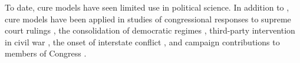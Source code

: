 \documentclass{article}
\begin{document}
	To date, cure models have seen limited use in political science. In addition to \citep{svolik2008}, cure models have been applied in studies of congressional responses to supreme court rulings \citep{hettinger2005}, the consolidation of democratic regimes \citep{svolik2008}, third-party intervention in civil war \citep{findley2006}, the onset of interstate conflict \citep{clark2003}, and campaign contributions to members of Congress \citep{box2005}.
	
	
\end{document}
